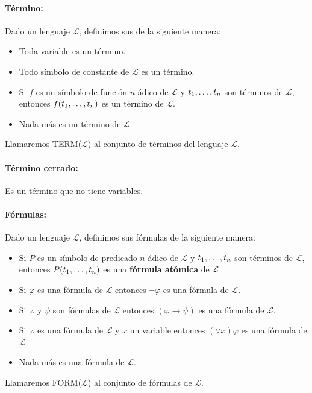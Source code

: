 \paragraph{Término:} Dado un lenguaje $\mathcal{L}$, definimos sus de la siguiente manera:

\begin{itemize}
	\item Toda variable es un término.
	\item Todo símbolo de constante de $\mathcal{L}$ es un término.
	\item Si $f$ es un símbolo de función $n$-ádico de $\mathcal{L}$ y $t_1,\dots, t_{n}$ son términos de $\mathcal{L}$, entonces $f(t_1,\dots, t_{n})$ es un término de $\mathcal{L}$.
	\item Nada más es un término de $\mathcal{L}$
\end{itemize}

Llamaremos TERM($\mathcal{L}$) al conjunto de términos del lenguaje $\mathcal{L}$.

\paragraph{Término cerrado:} Es un término que no tiene variables.

\paragraph{Fórmulas:} Dado un lenguaje $\mathcal{L}$, definimos sus fórmulas de la siguiente manera:

\begin{itemize}
	\item Si $P$ es un símbolo de predicado $n$-ádico de $\mathcal{L}$ y $t_1,\dots, t_{n}$ son términos de $\mathcal{L}$, entonces $P(t_1,\dots, t_{n})$ es una \textbf{fórmula atómica} de $\mathcal{L}$
	\item Si $\varphi$ es una fórmula de $\mathcal{L}$ entonces $\lnot\varphi$ es una fórmula de $\mathcal{L}$.
	\item Si $\varphi$ y $\psi$ son fórmulas de $\mathcal{L}$ entonces $(\varphi\to\psi)$ es una fórmula de $\mathcal{L}$.
	\item Si $\varphi$ es una fórmula de $\mathcal{L}$ y $x$ un variable entonces $(\forall x)\varphi$ es una fórmula de $\mathcal{L}$.
	\item Nada más es una fórmula de $\mathcal{L}$.
\end{itemize}

Llamaremos FORM($\mathcal{L}$) al conjunto de fórmulas de $\mathcal{L}$.

